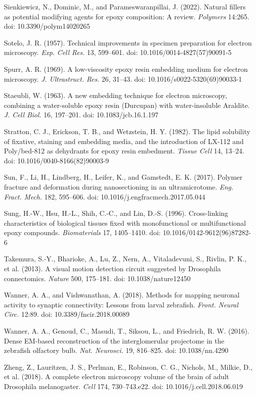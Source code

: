\documentclass{article}
\newenvironment{reflist}{\par\small\setlength{\parindent}{0pt}\everypar{\hangindent=2.2em\hangafter=1}}{\par}
\begin{document}
\begin{reflist}
Sienkiewicz, N., Dominic, M., and Parameswaranpillai, J. (2022). Natural fillers as potential modifying agents for epoxy composition: A review. \emph{Polymers} 14:265. doi: 10.3390/polym14020265

Sotelo, J. R. (1957). Technical improvements in specimen preparation for electron microscopy. \emph{Exp. Cell Res.} 13, 599–601. doi: 10.1016/0014-4827(57)90091-5

Spurr, A. R. (1969). A low-viscosity epoxy resin embedding medium for electron microscopy. \emph{J. Ultrastruct. Res.} 26, 31–43. doi: 10.1016/s0022-5320(69)90033-1

Staeubli, W. (1963). A new embedding technique for electron microscopy, combining a water-soluble epoxy resin (Durcupan) with water-insoluble Araldite. \emph{J. Cell Biol.} 16, 197–201. doi: 10.1083/jcb.16.1.197

Stratton, C. J., Erickson, T. B., and Wetzstein, H. Y. (1982). The lipid solubility of fixative, staining and embedding media, and the introduction of LX-112 and Poly/bed-812 as dehydrants for epoxy resin embedment. \emph{Tissue Cell} 14, 13–24. doi: 10.1016/0040-8166(82)90003-9

Sun, F., Li, H., Lindberg, H., Leifer, K., and Gamstedt, E. K. (2017). Polymer fracture and deformation during nanosectioning in an ultramicrotome. \emph{Eng. Fract. Mech.} 182, 595–606. doi: 10.1016/j.engfracmech.2017.05.044

Sung, H.-W., Hsu, H.-L., Shih, C.-C., and Lin, D.-S. (1996). Cross-linking characteristics of biological tissues fixed with monofunctional or multifunctional epoxy compounds. \emph{Biomaterials} 17, 1405–1410. doi: 10.1016/0142-9612(96)87282-6

Takemura, S.-Y., Bharioke, A., Lu, Z., Nern, A., Vitaladevuni, S., Rivlin, P. K., et al. (2013). A visual motion detection circuit suggested by Drosophila connectomics. \emph{Nature} 500, 175–181. doi: 10.1038/nature12450

Wanner, A. A., and Vishwanathan, A. (2018). Methods for mapping neuronal activity to synaptic connectivity: Lessons from larval zebrafish. \emph{Front. Neural Circ.} 12:89. doi: 10.3389/fncir.2018.00089

Wanner, A. A., Genoud, C., Masudi, T., Siksou, L., and Friedrich, R. W. (2016). Dense EM-based reconstruction of the interglomerular projectome in the zebrafish olfactory bulb. \emph{Nat. Neurosci.} 19, 816–825. doi: 10.1038/nn.4290

Zheng, Z., Lauritzen, J. S., Perlman, E., Robinson, C. G., Nichols, M., Milkie, D., et al. (2018). A complete electron microscopy volume of the brain of adult Drosophila melanogaster. \emph{Cell} 174, 730–743.e22. doi: 10.1016/j.cell.2018.06.019

\end{reflist}
\end{document}
